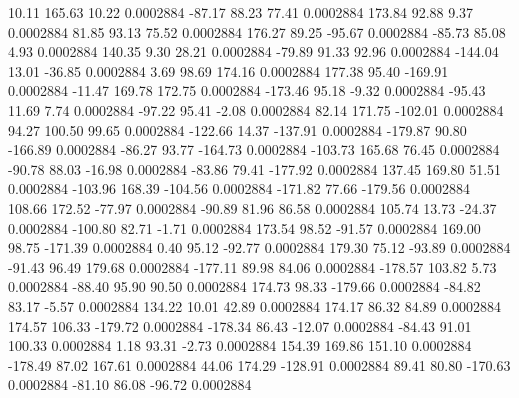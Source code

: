        10.11      165.63       10.22     0.0002884
      -87.17       88.23       77.41     0.0002884
      173.84       92.88        9.37     0.0002884
       81.85       93.13       75.52     0.0002884
      176.27       89.25      -95.67     0.0002884
      -85.73       85.08        4.93     0.0002884
      140.35        9.30       28.21     0.0002884
      -79.89       91.33       92.96     0.0002884
     -144.04       13.01      -36.85     0.0002884
        3.69       98.69      174.16     0.0002884
      177.38       95.40     -169.91     0.0002884
      -11.47      169.78      172.75     0.0002884
     -173.46       95.18       -9.32     0.0002884
      -95.43       11.69        7.74     0.0002884
      -97.22       95.41       -2.08     0.0002884
       82.14      171.75     -102.01     0.0002884
       94.27      100.50       99.65     0.0002884
     -122.66       14.37     -137.91     0.0002884
     -179.87       90.80     -166.89     0.0002884
      -86.27       93.77     -164.73     0.0002884
     -103.73      165.68       76.45     0.0002884
      -90.78       88.03      -16.98     0.0002884
      -83.86       79.41     -177.92     0.0002884
      137.45      169.80       51.51     0.0002884
     -103.96      168.39     -104.56     0.0002884
     -171.82       77.66     -179.56     0.0002884
      108.66      172.52      -77.97     0.0002884
      -90.89       81.96       86.58     0.0002884
      105.74       13.73      -24.37     0.0002884
     -100.80       82.71       -1.71     0.0002884
      173.54       98.52      -91.57     0.0002884
      169.00       98.75     -171.39     0.0002884
        0.40       95.12      -92.77     0.0002884
      179.30       75.12      -93.89     0.0002884
      -91.43       96.49      179.68     0.0002884
     -177.11       89.98       84.06     0.0002884
     -178.57      103.82        5.73     0.0002884
      -88.40       95.90       90.50     0.0002884
      174.73       98.33     -179.66     0.0002884
      -84.82       83.17       -5.57     0.0002884
      134.22       10.01       42.89     0.0002884
      174.17       86.32       84.89     0.0002884
      174.57      106.33     -179.72     0.0002884
     -178.34       86.43      -12.07     0.0002884
      -84.43       91.01      100.33     0.0002884
        1.18       93.31       -2.73     0.0002884
      154.39      169.86      151.10     0.0002884
     -178.49       87.02      167.61     0.0002884
       44.06      174.29     -128.91     0.0002884
       89.41       80.80     -170.63     0.0002884
      -81.10       86.08      -96.72     0.0002884
